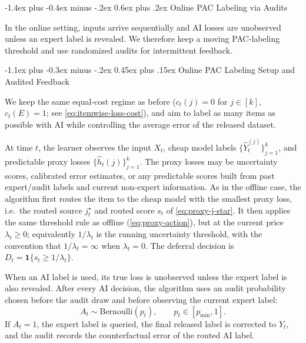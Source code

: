 \documentclass[11pt]{article}
\makeatletter
\renewcommand\section{\@startsection{section}{1}{\z@}%
  {-1.4ex plus -0.4ex minus -.2ex}%
  {0.6ex plus .2ex}%
  {\normalfont\Large\bfseries}}
\renewcommand\subsection{\@startsection{subsection}{2}{\z@}%
  {-1.1ex plus -0.3ex minus -.2ex}%
  {0.45ex plus .15ex}%
  {\normalfont\large\bfseries}}
\newcommand{\ind}[1]{\mathbf{1}\{#1\}}
\newcommand{\hatY}{\widehat Y}
\newcommand{\tildeY}{\widetilde Y}
\newcommand{\hath}{\widehat h}
\makeatother
\begin{document}
\section{Online PAC Labeling via Audits}
\label{sec:online-audited}

In the online setting, inputs arrive sequentially and AI losses are unobserved
unless an expert label is revealed. We therefore keep a moving PAC-labeling
threshold and use randomized audits for intermittent feedback.

\subsection{Online PAC Labeling Setup and Audited Feedback}
\label{sec:online-free-ai}

We keep the same equal-cost regime as before (\(c_t(j)=0\) for \(j\in[k]\),
\(c_t(E)=1\); see \eqref{eq:itemwise-loss-cost}), and aim to label as many items
as possible with AI while controlling the average error of the released dataset.

At time $t$, the learner observes the input $X_t$, cheap model labels
$\{\hatY_t^{(j)}\}_{j=1}^k$, and predictable proxy losses
$\{\hath_t(j)\}_{j=1}^k$.  The proxy losses may be uncertainty scores,
calibrated error estimates, or any predictable scores built from past
expert/audit labels and current non-expert information.
As in the offline case, the algorithm first routes the item to the cheap model
with the smallest proxy loss, i.e.\ the routed source $j_t^\star$ and routed
score $s_t$ of \eqref{eq:proxy-j-star}.
It then applies the same threshold rule as offline (\eqref{eq:proxy-action}),
but at the current price $\lambda_t\ge0$; equivalently $1/\lambda_t$ is the
running uncertainty threshold, with the convention that $1/\lambda_t=\infty$ when
$\lambda_t=0$.  The deferral decision is
\(
    D_t
    =
    \ind{s_t\ge 1/\lambda_t}.\)

When an AI label is used, its true loss is unobserved unless the expert label is
also revealed. After every AI decision, the algorithm uses an audit probability
chosen before the audit draw and before observing the current expert label:
\[
    A_t\sim\mathrm{Bernoulli}(p_t),
    \qquad p_t\in[p_{\min},1].
\]
If $A_t=1$, the expert label is queried, the final released label is
corrected to $Y_t$, and the audit records the counterfactual error of the
routed AI label.
\end{document}
